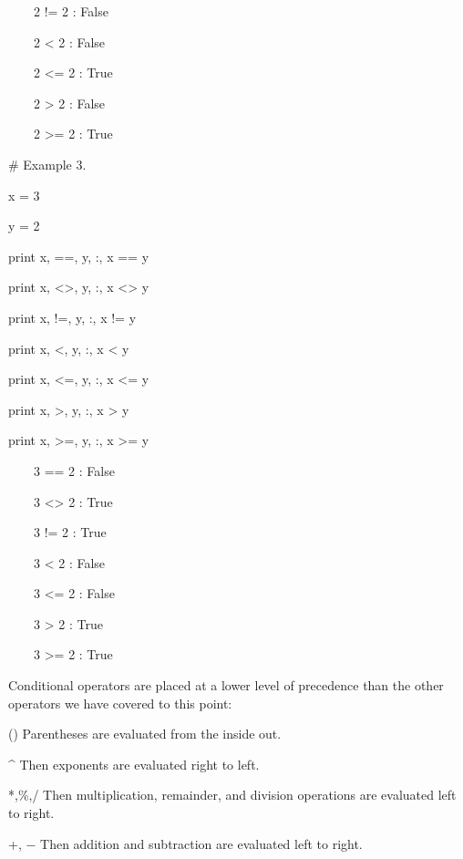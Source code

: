 \documentclass[12pt,oneside]{book}
\begin{document}
\ \ \ \ 2 != 2 : False

\ \ \ \ 2 {\textless} 2 : False

\ \ \ \ 2 {\textless}= 2 : True

\ \ \ \ 2 {\textgreater} 2 : False

\ \ \ \ 2 {\textgreater}= 2 : True


\# Example 3.

x = 3

y = 2 \ 


print x, {\textquotedbl}=={\textquotedbl}, y, {\textquotedbl}:{\textquotedbl}, x == y

print x, {\textquotedbl}{\textless}{\textgreater}{\textquotedbl}, y, {\textquotedbl}:{\textquotedbl}, x {\textless}{\textgreater} y

print x, {\textquotedbl}!={\textquotedbl}, y, {\textquotedbl}:{\textquotedbl}, x != y

print x, {\textquotedbl}{\textless}{\textquotedbl}, y, {\textquotedbl}:{\textquotedbl}, x {\textless} y

print x, {\textquotedbl}{\textless}={\textquotedbl}, y, {\textquotedbl}:{\textquotedbl}, x {\textless}= y

print x, {\textquotedbl}{\textgreater}{\textquotedbl}, y, {\textquotedbl}:{\textquotedbl}, x {\textgreater} y

print x, {\textquotedbl}{\textgreater}={\textquotedbl}, y, {\textquotedbl}:{\textquotedbl}, x {\textgreater}= y

{\textbar}

\ \ \ \ 3 == 2 : False

\ \ \ \ 3 {\textless}{\textgreater} 2 : True

\ \ \ \ 3 != 2 : True

\ \ \ \ 3 {\textless} 2 : False

\ \ \ \ 3 {\textless}= 2 : False

\ \ \ \ 3 {\textgreater} 2 : True

\ \ \ \ 3 {\textgreater}= 2 : True


Conditional operators are placed at a lower level of precedence than the other operators we have covered to this point:


() Parentheses are evaluated from the inside out.


\^{} Then exponents are evaluated right to left.


*,\%,/ Then multiplication, remainder, and division operations are evaluated left to right.


+, $-$ Then addition and subtraction are evaluated left to right.
\end{document}
